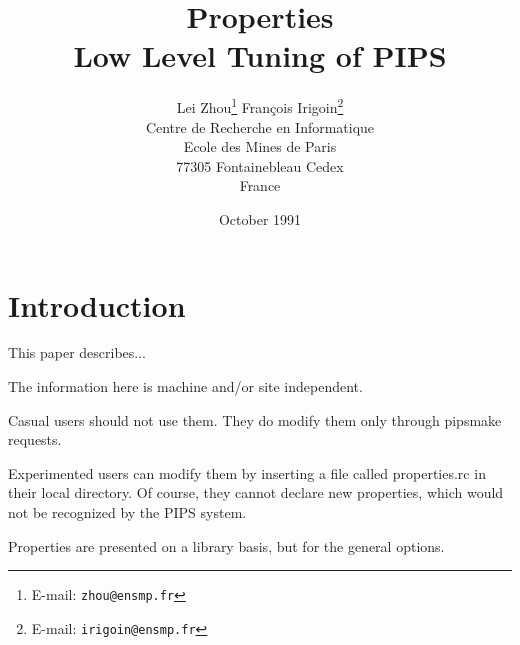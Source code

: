 %
%
%
% 

\batchmode
{}
\title{Properties \\
    Low Level Tuning of PIPS}
\author{Lei Zhou\thanks{E-mail: {\tt zhou@ensmp.fr}} \hspace{2cm} 
        Fran\c{c}ois Irigoin\thanks{E-mail: {\tt irigoin@ensmp.fr}} \vspace{1cm}\\
        Centre de Recherche en Informatique \\
        Ecole des Mines de Paris \\
        77305 Fontainebleau Cedex \\
        France \\}
\date{October 1991}

\addtolength{\textwidth}{72pt}
\addtolength{\oddsidemargin}{-48pt}
\addtolength{\evensidemargin}{-48pt}
\addtolength{\textheight}{172pt}
\addtolength{\topmargin}{-60pt}


\thispagestyle{empty}

\maketitle


\section*{Introduction}

This paper describes...

The information here is machine and/or site independent.

Casual users should not use them. They do modify them only through pipsmake
requests.

Experimented users can modify them by inserting a file called properties.rc
in their local directory. Of course, they cannot declare new properties,
which would not be recognized by the PIPS system.

Properties are presented on a library basis, but for the general options.

